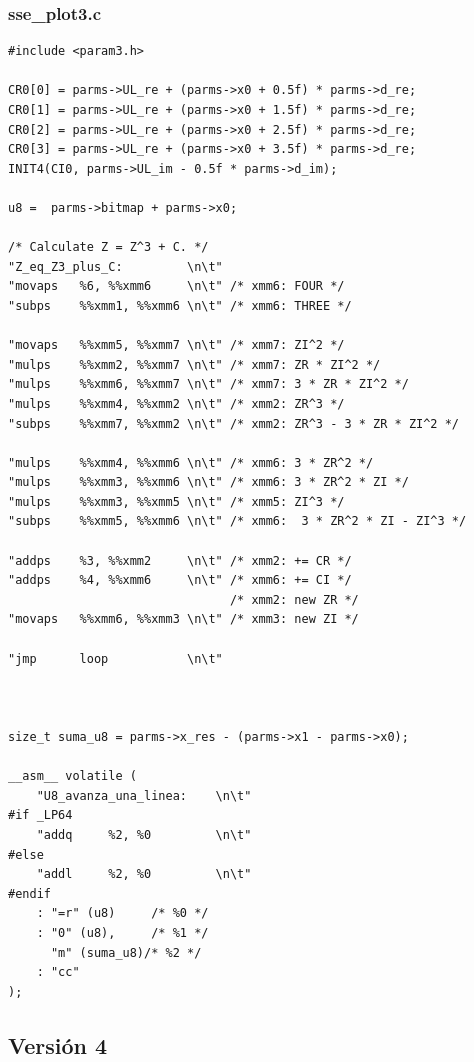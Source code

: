 \documentclass[a4paper,10pt]{article}
\begin{document}
\subsubsection{sse_plot3.c}
\begin{verbatim}
#include <param3.h>

CR0[0] = parms->UL_re + (parms->x0 + 0.5f) * parms->d_re;
CR0[1] = parms->UL_re + (parms->x0 + 1.5f) * parms->d_re;
CR0[2] = parms->UL_re + (parms->x0 + 2.5f) * parms->d_re;
CR0[3] = parms->UL_re + (parms->x0 + 3.5f) * parms->d_re;
INIT4(CI0, parms->UL_im - 0.5f * parms->d_im);

u8 =  parms->bitmap + parms->x0;

/* Calculate Z = Z^3 + C. */
"Z_eq_Z3_plus_C:         \n\t"
"movaps   %6, %%xmm6     \n\t" /* xmm6: FOUR */
"subps    %%xmm1, %%xmm6 \n\t" /* xmm6: THREE */

"movaps   %%xmm5, %%xmm7 \n\t" /* xmm7: ZI^2 */
"mulps    %%xmm2, %%xmm7 \n\t" /* xmm7: ZR * ZI^2 */
"mulps    %%xmm6, %%xmm7 \n\t" /* xmm7: 3 * ZR * ZI^2 */
"mulps    %%xmm4, %%xmm2 \n\t" /* xmm2: ZR^3 */
"subps    %%xmm7, %%xmm2 \n\t" /* xmm2: ZR^3 - 3 * ZR * ZI^2 */

"mulps    %%xmm4, %%xmm6 \n\t" /* xmm6: 3 * ZR^2 */
"mulps    %%xmm3, %%xmm6 \n\t" /* xmm6: 3 * ZR^2 * ZI */
"mulps    %%xmm3, %%xmm5 \n\t" /* xmm5: ZI^3 */
"subps    %%xmm5, %%xmm6 \n\t" /* xmm6:  3 * ZR^2 * ZI - ZI^3 */

"addps    %3, %%xmm2     \n\t" /* xmm2: += CR */
"addps    %4, %%xmm6     \n\t" /* xmm6: += CI */
							   /* xmm2: new ZR */
"movaps   %%xmm6, %%xmm3 \n\t" /* xmm3: new ZI */

"jmp      loop           \n\t"



size_t suma_u8 = parms->x_res - (parms->x1 - parms->x0);
		
__asm__ volatile (
	"U8_avanza_una_linea:    \n\t"
#if _LP64
	"addq     %2, %0         \n\t"
#else
	"addl     %2, %0         \n\t"
#endif		
	: "=r" (u8)		/* %0 */
	: "0" (u8),		/* %1 */
	  "m" (suma_u8)/* %2 */
	: "cc"
);

\end{verbatim}

\subsection{Versión 4}
\end{document}
